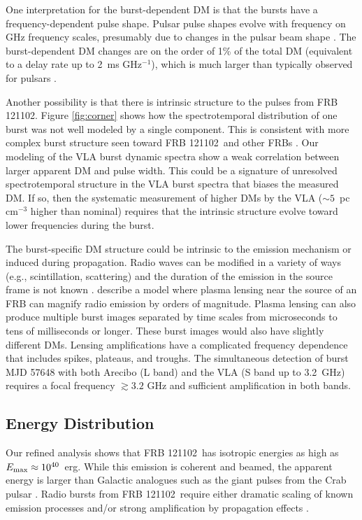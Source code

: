 \documentclass[twocolumn]{aastex61}
\newcommand{\frb}{FRB 121102}
\begin{document}
One interpretation for the burst-dependent DM is that the bursts have a frequency-dependent pulse shape. Pulsar pulse shapes evolve with frequency on GHz frequency scales, presumably due to changes in the pulsar beam shape \citep{1988MNRAS.234..477L}. The burst-dependent DM changes are on the order of 1\% of the total DM (equivalent to a delay rate up to 2~ms GHz$^{-1}$), which is much larger than typically observed for pulsars \citep{2017MNRAS.466.3706L}. 

Another possibility is that there is intrinsic structure to the pulses from \frb. Figure \ref{fig:corner} shows how the spectrotemporal distribution of one burst was not well modeled by a single component. This is consistent with more complex burst structure seen toward \frb\ and other FRBs \citep{2016Natur.531..202S,2016MNRAS.460L..30C}. Our modeling of the VLA burst dynamic spectra show a weak correlation between larger apparent DM and pulse width. This could be a signature of unresolved spectrotemporal structure in the VLA burst spectra that biases the measured DM. If so, then the systematic measurement of higher DMs by the VLA ($\sim5$~pc cm$^{-3}$ higher than nominal) requires that the intrinsic structure evolve toward lower frequencies during the burst.

The burst-specific DM structure could be intrinsic to the emission mechanism or induced during propagation. Radio waves can be modified in a variety of ways (e.g., scintillation, scattering) and the duration of the emission in the source frame is not known \citep{2016arXiv160505890C}. \citet{2017arXiv170306580C} describe a model where plasma lensing near the source of an FRB can magnify radio emission by orders of magnitude. Plasma lensing can also produce multiple burst images separated by time scales from microseconds to tens of milliseconds or longer. These burst images would also have slightly different DMs. Lensing amplifications have a complicated frequency dependence that includes spikes, plateaus, and troughs. The simultaneous detection of burst MJD 57648 with both Arecibo (L band) and the VLA (S band up to 3.2~GHz) requires a focal frequency $\gtrsim 3.2$ GHz and sufficient amplification in both bands.   

\subsection{Energy Distribution}

Our refined analysis shows that \frb\ has isotropic energies as high as $E_{\rm{max}}\approx10^{40}$\ erg. While this emission is coherent and beamed, the apparent energy is larger than Galactic analogues such as the giant pulses from the Crab pulsar \citep[$\sim10^{35}$~erg, $T_{b,\rm{Crab}}\sim10^{41}$~K;][]{2003Natur.422..141H,2014PhRvD..89j3009K}. Radio bursts from \frb\ require either dramatic scaling of known emission processes \citep{2016MNRAS.462..941L, 2016MNRAS.457..232C} and/or strong amplification by propagation effects \citep{2017arXiv170306580C}.
\end{document}
